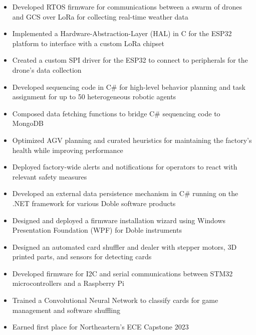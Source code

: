 \documentclass[10pt,a4paper,ragged2e,withhyper]{altacv}
\begin{document}
    \begin{itemize}
        \item Developed RTOS firmware for communications between a swarm of drones and GCS over LoRa for collecting real-time weather data
        \item Implemented a Hardware-Abstraction-Layer (HAL) in C for the ESP32 platform to interface with a custom LoRa chipset
        \item Created a custom SPI driver for the ESP32 to connect to peripherals for the drone's data collection
    \end{itemize}
    \begin{itemize}
        \item Developed sequencing code in C\# for high-level behavior planning and task assignment for up to 50 heterogeneous robotic agents
        \item Composed data fetching functions to bridge C\# sequencing code to MongoDB
        \item Optimized AGV planning and curated heuristics for maintaining the factory's health while improving performance
        \item Deployed factory-wide alerts and notifications for operators to react with relevant safety measures
    \end{itemize}
    \begin{itemize}
        \item Developed an external data persistence mechanism in C\# running on the .NET framework for various Doble software products
        \item Designed and deployed a firmware installation wizard using Windows Presentation Foundation (WPF) for Doble instruments
    \end{itemize}
    \vspace{-1.5em}
    \begin{itemize}
        \item Designed an automated card shuffler and dealer with stepper motors, 3D printed parts, and sensors for detecting cards
        \item Developed firmware for I2C and serial communications between STM32 microcontrollers and a Raspberry Pi
        \item Trained a Convolutional Neural Network to classify cards for game management and software shuffling
        \item Earned first place for Northeastern's ECE Capstone 2023
    \end{itemize}
\end{document}
